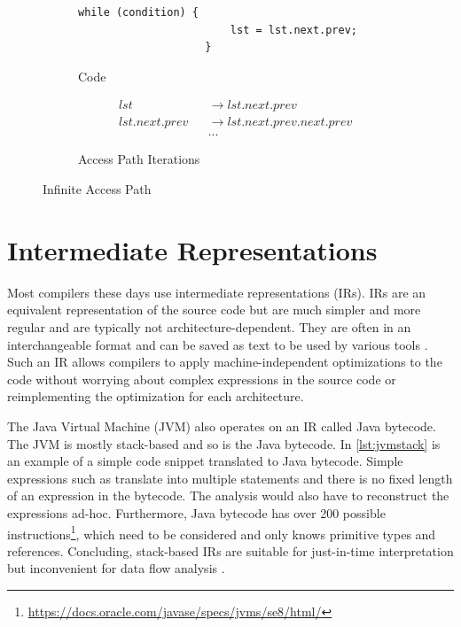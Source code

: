\documentclass[../draft.tex]{subfiles}
\begin{document}
    \begin{figure}[t]
        \centering
        \begin{subfigure}[b]{0.45\textwidth}
            \centering
            \begin{adjustbox}{max width=\columnwidth}
                \begin{lstlisting}[gobble=20]
                    while (condition) {
                        lst = lst.next.prev;
                    }
                \end{lstlisting}
            \end{adjustbox}
            \caption{Code}
        \end{subfigure}
        \qquad
        \begin{subfigure}[b]{0.45\textwidth}
            \centering
            \small
            $$
            \begin{aligned}
                &lst& &\rightarrow lst.next.prev\\
                &lst.next.prev& &\rightarrow lst.next.prev.next.prev\\
                & & &...
            \end{aligned}
            $$
            \normalsize
            \caption{Access Path Iterations}
        \end{subfigure}
        \caption{Infinite Access Path}
        \label{lst:infiniteap}
    \end{figure}

    \section{Intermediate Representations}\label{s:jimple}
    Most compilers these days use intermediate representations (IRs). IRs are an equivalent representation of the source code but are much simpler and more regular and are typically not architecture-dependent. They are often in an interchangeable format and can be saved as text to be used by various tools \cite{Thain2019}.
    Such an IR allows compilers to apply machine-independent optimizations to the code without worrying about complex expressions in the source code or reimplementing the optimization for each architecture. 

    The Java Virtual Machine (JVM) also operates on an IR called Java bytecode. The JVM is mostly stack-based and so is the Java bytecode. In \autoref{lst:jvmstack} is an example of a simple code snippet translated to Java bytecode. Simple expressions such as  translate into multiple statements and there is no fixed length of an expression in the bytecode. The analysis would also have to reconstruct the expressions ad-hoc. Furthermore, Java bytecode has over 200 possible instructions\footnote{\url{https://docs.oracle.com/javase/specs/jvms/se8/html/}}, which need to be considered and only knows primitive types and references. Concluding, stack-based IRs are suitable for just-in-time interpretation but inconvenient for data flow analysis \cite{Valleerai2004}.
\end{document}

